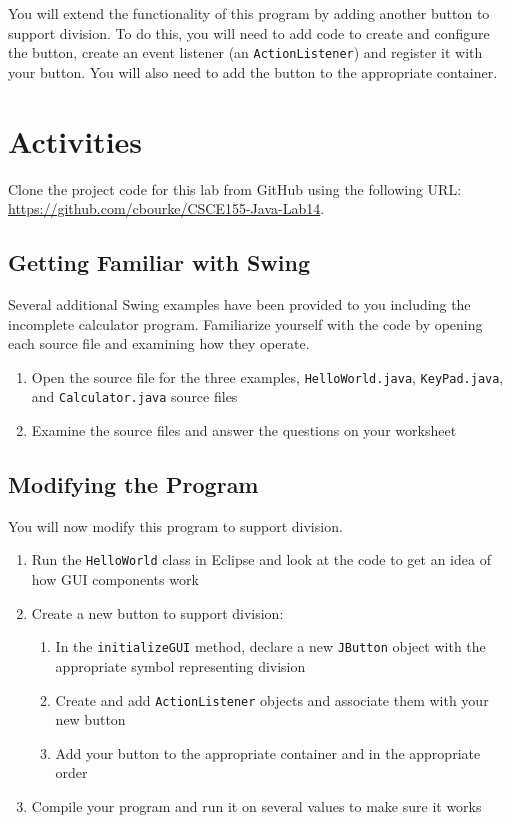 \documentclass[12pt]{scrartcl}
\begin{document}
You will extend the functionality of this program by adding another button 
to support division.  To do this, you will need to add code to create and 
configure the button, create an event listener (an \texttt{ActionListener}) 
and register it with your button.  You will also need to add the button to 
the appropriate container.

\section{Activities}

Clone the project code for this lab from GitHub using the following
URL: \url{https://github.com/cbourke/CSCE155-Java-Lab14}.

\subsection{Getting Familiar with Swing}

Several additional Swing examples have been provided to you 
including the incomplete calculator program.  Familiarize yourself 
with the code by opening each source file and examining how they 
operate.
\begin{enumerate}
  \item Open the source file for the three examples, \texttt{HelloWorld.java}, 
 	 \texttt{KeyPad.java}, and \texttt{Calculator.java} source files
  \item Examine the source files and answer the questions on your worksheet 
\end{enumerate}
	 
\subsection{Modifying the Program}

You will now modify this program to support division.

\begin{enumerate}
  \item Run the \texttt{HelloWorld} class in Eclipse and 
  	look at the code to get an idea of how GUI components work
  \item Create a new button to support division:
  \begin{enumerate}
    \item In the \texttt{initializeGUI} method, declare a 
    	new \texttt{JButton} object with the appropriate symbol 
	representing division
    \item Create and add \texttt{ActionListener} objects and 
	associate them with your new button
    \item Add your button to the appropriate container and in the appropriate 
	order
  \end{enumerate}
  \item Compile your program and run it on several values to make 
  sure it works
\end{enumerate}
\end{document}

